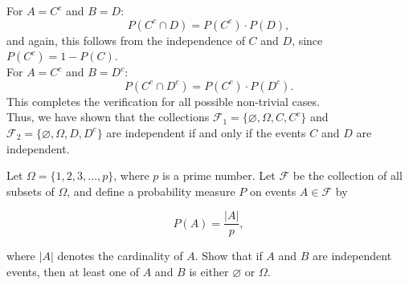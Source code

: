 \begin{solution}
   For \( A = C^c \) and \( B = D \):
     \[
     P(C^c \cap D) = P(C^c) \cdot P(D),
     \]
     and again, this follows from the independence of \( C \) and \( D \), since \( P(C^c) = 1 - P(C) \).\\

   For \( A = C^c \) and \( B = D^c \):
     \[
     P(C^c \cap D^c) = P(C^c) \cdot P(D^c).
     \]
     This completes the verification for all possible non-trivial cases.\\

     Thus, we have shown that the collections \( \mathcal{F}_1 = \{\varnothing, \Omega, C, C^c\} \) and \( \mathcal{F}_2 = \{\varnothing, \Omega, D, D^c\} \) are independent if and only if the events \( C \) and \( D \) are independent.\\
\end{solution}


\begin{exercise}
    Let \(\Omega = \{1, 2, 3, \dots, p\}\), where \(p\) is a prime number. Let \(\mathcal{F}\) be the collection of all subsets of \(\Omega\), and define a probability measure \(P\) on events \(A \in \mathcal{F}\) by

\[
P(A) = \frac{|A|}{p},
\]

where \(|A|\) denotes the cardinality of \(A\). Show that if \(A\) and \(B\) are independent events, then at least one of \(A\) and \(B\) is either \(\varnothing\) or \(\Omega\).
\end{exercise}

